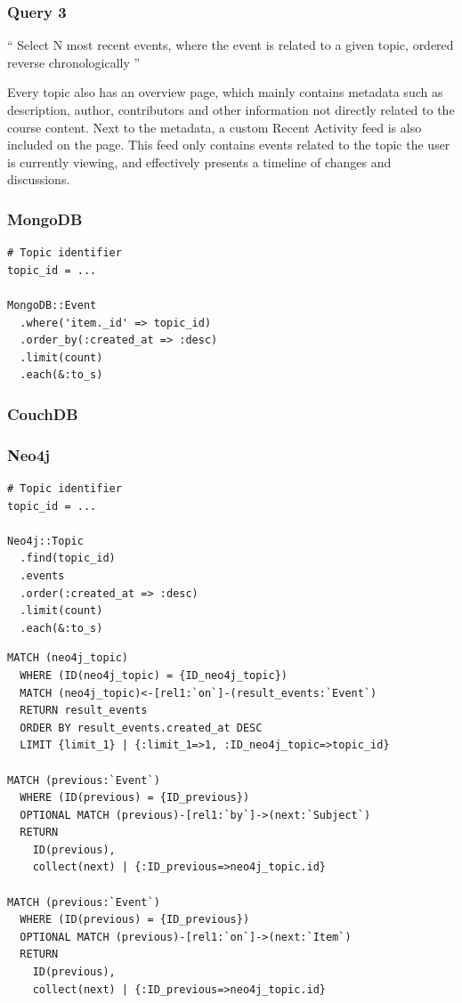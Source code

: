 \subsubsection{Query 3}
\label{subsubsec:query-3}

``
Select N most recent events, where the event is related to a given topic, ordered reverse chronologically
''

Every topic also has an overview page, which mainly contains metadata such as description, author, contributors and other information not directly related to the course content.
Next to the metadata, a custom Recent Activity feed is also included on the page.
This feed only contains events related to the topic the user is currently viewing, and effectively presents a timeline of changes and discussions.

\subsubsection*{MongoDB}

\begin{verbatim}
# Topic identifier
topic_id = ...

MongoDB::Event
  .where('item._id' => topic_id)
  .order_by(:created_at => :desc)
  .limit(count)
  .each(&:to_s)
\end{verbatim}

\subsubsection*{CouchDB}


\subsubsection*{Neo4j}

\begin{verbatim}
# Topic identifier
topic_id = ...

Neo4j::Topic
  .find(topic_id)
  .events
  .order(:created_at => :desc)
  .limit(count)
  .each(&:to_s)
\end{verbatim}

\begin{verbatim}
MATCH (neo4j_topic)
  WHERE (ID(neo4j_topic) = {ID_neo4j_topic})
  MATCH (neo4j_topic)<-[rel1:`on`]-(result_events:`Event`)
  RETURN result_events
  ORDER BY result_events.created_at DESC
  LIMIT {limit_1} | {:limit_1=>1, :ID_neo4j_topic=>topic_id}

MATCH (previous:`Event`)
  WHERE (ID(previous) = {ID_previous})
  OPTIONAL MATCH (previous)-[rel1:`by`]->(next:`Subject`)
  RETURN
    ID(previous),
    collect(next) | {:ID_previous=>neo4j_topic.id}

MATCH (previous:`Event`)
  WHERE (ID(previous) = {ID_previous})
  OPTIONAL MATCH (previous)-[rel1:`on`]->(next:`Item`)
  RETURN
    ID(previous),
    collect(next) | {:ID_previous=>neo4j_topic.id}
\end{verbatim}


